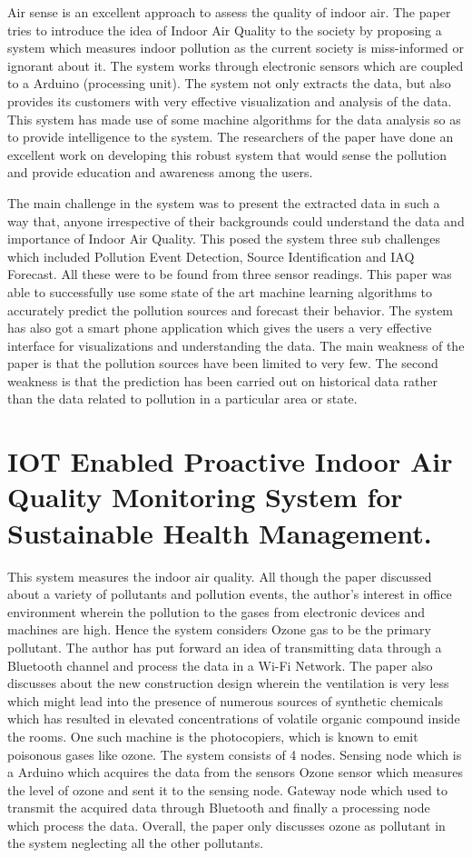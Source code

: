 \documentclass[11pt]{article}
\begin{document}
Air sense is an excellent approach to assess the quality of indoor air. The paper tries to introduce the idea of Indoor Air Quality to the society by proposing a system which measures indoor pollution as the current society is miss-informed or ignorant about it. The system works through electronic sensors which are coupled to a Arduino (processing unit). The system not only extracts the data, but also provides its customers with very effective visualization and analysis of the data. This system has made use of some machine algorithms for the data analysis so as to provide intelligence to the system. The researchers of the paper have done an excellent work on developing this robust system that would sense the pollution and provide education and awareness among the users.

The main challenge in the system was to present the extracted data in such a way that, anyone irrespective of their backgrounds could understand the data and importance of Indoor Air Quality. This posed the system three sub challenges which included Pollution Event Detection, Source Identification and IAQ Forecast. All these were to be found from three sensor readings. This paper was able to successfully use some state of the art machine learning algorithms to accurately predict the pollution sources and forecast their behavior. The system has also got a smart phone application which gives the users a very effective interface for visualizations and understanding the data.
The main weakness of the paper is that the pollution sources have been limited to very few. The second weakness is that the prediction has been carried out on historical data rather than the data related to pollution in a particular area or state.


\section{IOT Enabled Proactive Indoor Air Quality Monitoring System for Sustainable Health Management.}\cite{Firdhous2017}
This system measures the indoor air quality. All though the paper discussed about a variety of pollutants and pollution events, the author's interest in office environment wherein the pollution to the gases from electronic devices and machines are high. Hence the system considers Ozone gas to be the primary pollutant. The author has put forward an idea of transmitting data through a Bluetooth channel and process the data in a Wi-Fi Network. The paper also discusses about the new construction design wherein the ventilation is very less which might lead into the presence of numerous sources of synthetic chemicals which has resulted in elevated concentrations of volatile organic compound inside the rooms. One such machine is the photocopiers, which is known to emit poisonous gases like ozone. The system consists of 4 nodes.
Sensing node which is a Arduino which acquires the data from the sensors
Ozone sensor which measures the level of ozone and sent it to the sensing node. 
Gateway node which used to transmit the acquired data through Bluetooth and finally a processing node which process the data.
Overall, the paper only discusses ozone as pollutant in the system neglecting all the other pollutants.
\end{document}
